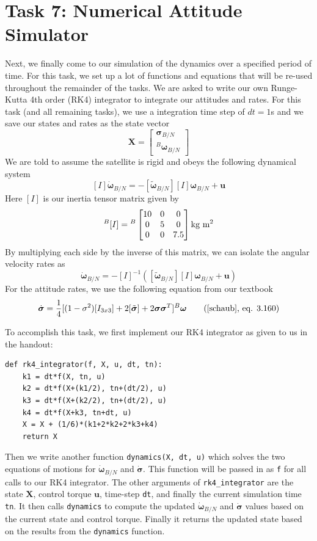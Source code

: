 \documentclass[conf]{new-aiaa}
\begin{document}
\section{Task 7: Numerical Attitude Simulator}
Next, we finally come to our simulation of the dynamics over a specified period of time. For this task, we set up a lot of functions and equations that will be re-used throughout the remainder of the tasks. We are asked to write our own Runge-Kutta 4th order (RK4) integrator to integrate our attitudes and rates. For this task (and all remaining tasks), we use a integration time step of $dt=1$s and we save our states and rates as the state vector
\[
\bm{X} = \begin{bmatrix} \bm\sigma_{B/N} \\ {}^B\bm\omega_{B/N} \end{bmatrix}
\]
We are told to assume the satellite is rigid and obeys the following dynamical system
\[
[I]\dot{\bm\omega}_{B/N} = -[\tilde{\bm\omega}_{B/N}][I]\bm\omega_{B/N} + \bm u
\]
Here $[I]$ is our inertia tensor matrix given by
\[
{}^B[I] = {}^B\begin{bmatrix}
10 & 0 & 0 \\
0 & 5 & 0 \\
0 & 0 & 7.5
\end{bmatrix} \text{kg m\textsuperscript{2}}
\]
By multiplying each side by the inverse of this matrix, we can isolate the angular velocity rates as
\[
\dot{\bm\omega}_{B/N} = -[I]^{-1}([\tilde{\bm\omega}_{B/N}][I]\bm\omega_{B/N} + \bm u)
\]
For the attitude rates, we use the following equation from our textbook
\[
\dot{\bm{\sigma}} = \frac{1}{4}[(1-\sigma^2)[I_{3x3}] + 2[\tilde{\bm{\sigma}}]+2\bm\sigma\bm\sigma^T]{}^B\bm\omega \tag{\cite{schaub},~eq. 3.160}
\]

To accomplish this task, we first implement our RK4 integrator as given to us in the handout:
\begin{verbatim}
def rk4_integrator(f, X, u, dt, tn):
    k1 = dt*f(X, tn, u)
    k2 = dt*f(X+(k1/2), tn+(dt/2), u)
    k3 = dt*f(X+(k2/2), tn+(dt/2), u)
    k4 = dt*f(X+k3, tn+dt, u)
    X = X + (1/6)*(k1+2*k2+2*k3+k4)
    return X
\end{verbatim}
Then we write another function \texttt{dynamics(X, dt, u)} which solves the two equations of motions for $\dot{\bm\omega}_{B/N}$ and $\dot{\bm{\sigma}}$. This function will be passed in as \texttt{f} for all calls to our RK4 integrator. The other arguments of \texttt{rk4\_integrator} are the state $\bm X$, control torque $\bm u$, time-step \texttt{dt}, and finally the current simulation time \texttt{tn}. It then calls \texttt{dynamics} to compute the updated $\dot{\bm\omega}_{B/N}$ and $\dot{\bm{\sigma}}$ values based on the current state and control torque. Finally it returns the updated state based on the results from the \texttt{dynamics} function. 
\end{document}
